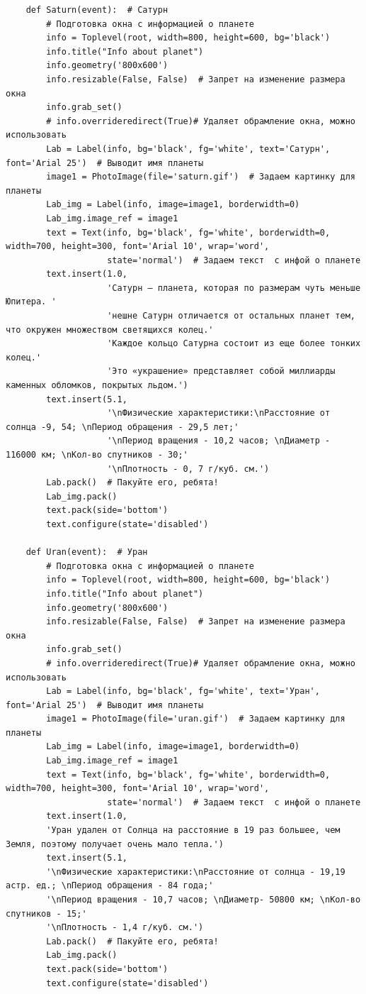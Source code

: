 \documentclass[11pt,a4paper]{report}
\begin{document}
\begin{verbatim}
    def Saturn(event):  # Сатурн
        # Подготовка окна с информацией о планете
        info = Toplevel(root, width=800, height=600, bg='black')
        info.title("Info about planet")
        info.geometry('800x600')
        info.resizable(False, False)  # Запрет на изменение размера окна
        info.grab_set()
        # info.overrideredirect(True)# Удаляет обрамление окна, можно использовать
        Lab = Label(info, bg='black', fg='white', text='Сатурн', font='Arial 25')  # Выводит имя планеты
        image1 = PhotoImage(file='saturn.gif')  # Задаем картинку для планеты
        Lab_img = Label(info, image=image1, borderwidth=0)
        Lab_img.image_ref = image1
        text = Text(info, bg='black', fg='white', borderwidth=0, width=700, height=300, font='Arial 10', wrap='word',
                    state='normal')  # Задаем текст  с инфой о планете
        text.insert(1.0,
                    'Сатурн — планета, которая по размерам чуть меньше Юпитера. '
                    'нешне Сатурн отличается от остальных планет тем, что окружен множеством светящихся колец.'
                    'Каждое кольцо Сатурна состоит из еще более тонких колец.'
                    'Это «украшение» представляет собой миллиарды каменных обломков, покрытых льдом.')
        text.insert(5.1,
                    '\nФизические характеристики:\nРасстояние от солнца -9, 54; \nПериод обращения - 29,5 лет;'
                    '\nПериод вращения - 10,2 часов; \nДиаметр - 116000 км; \nКол-во спутников - 30;'
                    '\nПлотность - 0, 7 г/куб. см.')
        Lab.pack()  # Пакуйте его, ребята!
        Lab_img.pack()
        text.pack(side='bottom')
        text.configure(state='disabled')

    def Uran(event):  # Уран
        # Подготовка окна с информацией о планете
        info = Toplevel(root, width=800, height=600, bg='black')
        info.title("Info about planet")
        info.geometry('800x600')
        info.resizable(False, False)  # Запрет на изменение размера окна
        info.grab_set()
        # info.overrideredirect(True)# Удаляет обрамление окна, можно использовать
        Lab = Label(info, bg='black', fg='white', text='Уран', font='Arial 25')  # Выводит имя планеты
        image1 = PhotoImage(file='uran.gif')  # Задаем картинку для планеты
        Lab_img = Label(info, image=image1, borderwidth=0)
        Lab_img.image_ref = image1
        text = Text(info, bg='black', fg='white', borderwidth=0, width=700, height=300, font='Arial 10', wrap='word',
                    state='normal')  # Задаем текст  с инфой о планете
        text.insert(1.0,
        'Уран удален от Солнца на расстояние в 19 раз большее, чем Земля, поэтому получает очень мало тепла.')
        text.insert(5.1,
        '\nФизические характеристики:\nРасстояние от солнца - 19,19 астр. ед.; \nПериод обращения - 84 года;'
        '\nПериод вращения - 10,7 часов; \nДиаметр- 50800 км; \nКол-во спутников - 15;'
        '\nПлотность - 1,4 г/куб. см.')
        Lab.pack()  # Пакуйте его, ребята!
        Lab_img.pack()
        text.pack(side='bottom')
        text.configure(state='disabled')


\end{verbatim}
\end{document}
